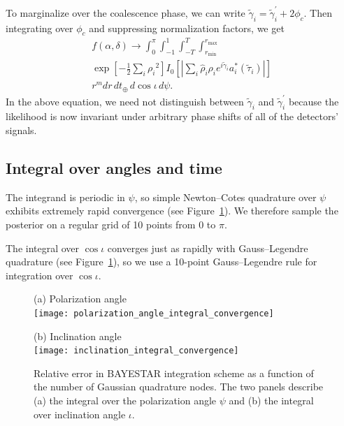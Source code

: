 \documentclass[amsmath,amssymb,aps,prx,reprint,nopreprintnumbers,nofootinbib]{revtex4-1}
\begin{document}
To marginalize over the coalescence phase, we can write $\tilde{\gamma}_i = \tilde{\gamma}_i^\prime + 2\phi_c$. Then integrating over $\phi_c$ and suppressing normalization factors, we get
%
\begin{multline}
    f(\alpha, \delta) \rightarrow
    \int_{0}^{\pi}
    \int_{-1}^{1}
    \int_{-T}^{T}
    \int_{r_\mathrm{min}}^{r_\mathrm{max}}
    \\
    \exp \left[ - \frac{1}{2} \sum_i {\rho_i}^2 \right] I_0 \left[
            \left| \sum_i \hat\rho_i \rho_i e^{i \tilde{\gamma}_i} a_i^*(\tilde{\tau}_i)
            \right|
    \right] \\
    r^m dr \, dt_\oplus \, d\cos{\iota} \, d\psi.
\end{multline}
%
In the above equation, we need not distinguish between $\tilde{\gamma}_i$ and $\tilde{\gamma}_i^\prime$ because the likelihood is now invariant under arbitrary phase shifts of all of the detectors' signals.

\subsection{Integral over angles and time}

The integrand is periodic in $\psi$, so simple Newton\nobreakdashes--Cotes quadrature over $\psi$ exhibits extremely rapid convergence (see Figure~\ref{fig:angle-convergence}). We therefore sample the posterior on a regular grid of 10 points from 0 to $\pi$.

The integral over $\cos\iota$ converges just as rapidly with Gauss\nobreakdashes--Legendre quadrature (see Figure~\ref{fig:angle-convergence}), so we use a 10\nobreakdashes-point Gauss\nobreakdashes--Legendre rule for integration over $\cos\iota$.

\begin{figure}
    \begin{minipage}[t]{0.5\textwidth}
        \centering
        (a) Polarization angle \\
        \texttt{[image: polarization\_angle\_integral\_convergence]}
    \end{minipage}%
    \begin{minipage}[t]{0.5\textwidth}
        \centering
        (b) Inclination angle \\
        \texttt{[image: inclination\_integral\_convergence]}
    \end{minipage}
    \caption{\label{fig:angle-convergence}Relative error in \ac{BAYESTAR} integration scheme as a function of the number of Gaussian quadrature nodes. The two panels describe (a) the integral over the polarization angle $\psi$ and (b) the integral over inclination angle $\iota$.}
\end{figure}
\end{document}
